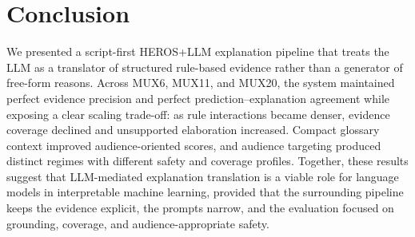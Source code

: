 \documentclass[sigconf,nonacm]{acmart}
\begin{document}
\section{Conclusion}
We presented a script-first HEROS+LLM explanation pipeline that treats the LLM as a translator of structured rule-based evidence rather than a generator of free-form reasons. Across MUX6, MUX11, and MUX20, the system maintained perfect evidence precision and perfect prediction--explanation agreement while exposing a clear scaling trade-off: as rule interactions became denser, evidence coverage declined and unsupported elaboration increased. Compact glossary context improved audience-oriented scores, and audience targeting produced distinct regimes with different safety and coverage profiles. Together, these results suggest that LLM-mediated explanation translation is a viable role for language models in interpretable machine learning, provided that the surrounding pipeline keeps the evidence explicit, the prompts narrow, and the evaluation focused on grounding, coverage, and audience-appropriate safety.



\end{document}
